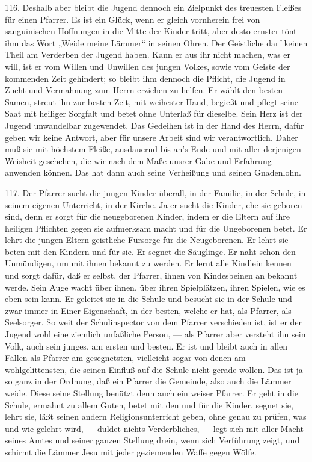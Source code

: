 116. Deshalb aber bleibt die Jugend dennoch ein Zielpunkt des treuesten Fleißes für einen Pfarrer. Es ist ein Glück, wenn er gleich vornherein frei von sanguinischen Hoffnungen in die Mitte der Kinder tritt, aber desto ernster tönt ihm das Wort „Weide meine Lämmer“ in seinen Ohren. Der Geistliche darf keinen Theil am Verderben der Jugend haben. Kann er aus ihr nicht machen, was er will, ist er vom Willen und Unwillen des jungen Volkes, sowie vom Geiste der kommenden Zeit gehindert; so bleibt ihm dennoch die Pflicht, die Jugend in Zucht und Vermahnung zum Herrn erziehen zu helfen. Er wählt den besten Samen, streut ihn zur besten Zeit, mit weihester Hand, begießt und pflegt seine Saat mit heiliger Sorgfalt und betet ohne Unterlaß für dieselbe. Sein Herz ist der Jugend unwandelbar zugewendet. Das Gedeihen ist in der Hand des Herrn, dafür geben wir keine Antwort, aber für unsere Arbeit sind wir verantwortlich. Daher muß sie mit höchstem Fleiße, ausdauernd bis an’s Ende und mit aller derjenigen Weisheit geschehen, die wir nach dem Maße unsrer Gabe und Erfahrung anwenden können. Das hat dann auch seine Verheißung und seinen Gnadenlohn.

117. Der Pfarrer sucht die jungen Kinder überall, in der Familie, in der Schule, in seinem eigenen Unterricht, in der Kirche. Ja er sucht die Kinder, ehe sie geboren sind, denn er sorgt für die neugeborenen Kinder,
indem er die Eltern auf ihre heiligen Pflichten gegen sie aufmerksam macht und für die Ungeborenen betet. Er lehrt die jungen Eltern geistliche Fürsorge für die Neugeborenen. Er lehrt sie beten mit den Kindern und für sie. Er segnet die Säuglinge. Er naht schon den Unmündigen, um mit ihnen bekannt zu werden. Er lernt alle Kindlein kennen und sorgt dafür, daß er selbst, der Pfarrer, ihnen von Kindesbeinen an bekannt werde. Sein Auge wacht über ihnen, über ihren Spielplätzen, ihren Spielen, wie es eben sein kann. Er geleitet sie in die Schule und besucht sie in der Schule und zwar immer in Einer Eigenschaft, in der besten, welche er hat, als Pfarrer, als Seelsorger. So weit der Schulinspector von dem Pfarrer verschieden ist, ist er der Jugend wohl eine ziemlich unfaßliche Person, — als Pfarrer aber versteht ihn sein Volk, auch sein junges, am ersten und besten. Er ist und bleibt auch in allen Fällen als Pfarrer am gesegnetsten, vielleicht sogar von denen am wohlgelittensten, die seinen Einfluß auf die Schule nicht gerade wollen. Das ist ja so ganz in der Ordnung, daß ein Pfarrer die Gemeinde, also auch die Lämmer weide. Diese seine Stellung benützt denn auch ein weiser Pfarrer. Er geht in die Schule, ermahnt zu allem Guten, betet mit den und für die Kinder, segnet sie, lehrt sie, läßt seinen andern Religionsunterricht geben, ohne genau zu prüfen, was und wie gelehrt wird, — duldet nichts Verderbliches, — legt sich mit aller Macht seines Amtes und seiner ganzen Stellung drein, wenn sich Verführung zeigt, und schirmt die Lämmer Jesu mit jeder geziemenden Waffe gegen Wölfe.

